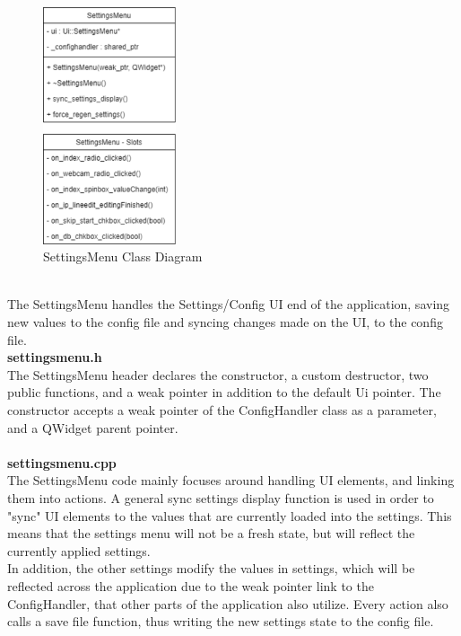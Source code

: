\documentclass[conference]{IEEEtran}
\begin{document}
\begin{figure}[h]
    \centering
    \includegraphics[width=0.35\textwidth]{images/code_diagrams/settingsmenu.eps}
    \caption{SettingsMenu Class Diagram}
\end{figure}~\\

The SettingsMenu handles the Settings/Config UI end of the application, saving new values to the config file and syncing changes made on the UI, to the config file.\\


\textbf{settingsmenu.h}~\\

The SettingsMenu header declares the constructor, a custom destructor, two public functions, and a weak pointer in addition to the default Ui pointer. The constructor accepts a weak pointer of the ConfigHandler class as a parameter, and a QWidget parent pointer. ~\\~\\


\textbf{settingsmenu.cpp}~\\

The SettingsMenu code mainly focuses around handling UI elements, and linking them into actions. A general sync settings display function is used in order to "sync" UI elements to the values that are currently loaded into the settings. This means that the settings menu will not be a fresh state, but will reflect the currently applied settings.\\

In addition, the other settings modify the values in settings, which will be reflected across the application due to the weak pointer link to the ConfigHandler, that other parts of the application also utilize. Every action also calls a save file function, thus writing the new settings state to the config file.~\\~\\
\end{document}

